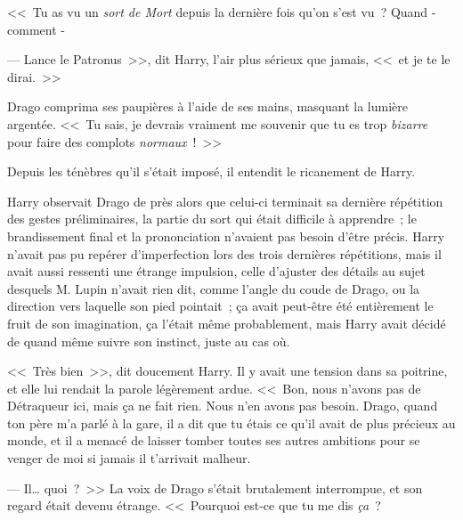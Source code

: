 <<~Tu as vu un \emph{sort de Mort} depuis la dernière fois qu'on s'est vu~? Quand - comment -

--- Lance le Patronus~>>, dit Harry, l'air plus sérieux que jamais, <<~et je te le dirai.~>>

Drago comprima ses paupières à l'aide de ses mains, masquant la lumière argentée. <<~Tu sais, je devrais vraiment me souvenir que tu es trop \emph{bizarre} pour faire des complots \emph{normaux}~!~>>

Depuis les ténèbres qu'il s'était imposé, il entendit le ricanement de Harry.

\later

Harry observait Drago de près alors que celui-ci terminait sa dernière répétition des gestes préliminaires, la partie du sort qui était difficile à apprendre~; le brandissement final et la prononciation n'avaient pas besoin d'être précis. Harry n'avait pas pu repérer d'imperfection lors des trois dernières répétitions, mais il avait aussi ressenti une étrange impulsion, celle d'ajuster des détails au sujet desquels M. Lupin n'avait rien dit, comme l'angle du coude de Drago, ou la direction vers laquelle son pied pointait~; ça avait peut-être été entièrement le fruit de son imagination, ça l'était même probablement, mais Harry avait décidé de quand même suivre son instinct, juste au cas où.

<<~Très bien~>>, dit doucement Harry. Il y avait une tension dans sa poitrine, et elle lui rendait la parole légèrement ardue. <<~Bon, nous n'avons pas de Détraqueur ici, mais ça ne fait rien. Nous n'en avons pas besoin. Drago, quand ton père m'a parlé à la gare, il a dit que tu étais ce qu'il avait de plus précieux au monde, et il a menacé de laisser tomber toutes ses autres ambitions pour se venger de moi si jamais il t'arrivait malheur.

--- Il… quoi~?~>> La voix de Drago s'était brutalement interrompue, et son regard était devenu étrange. <<~Pourquoi est-ce que tu me dis \emph{ça}~?

